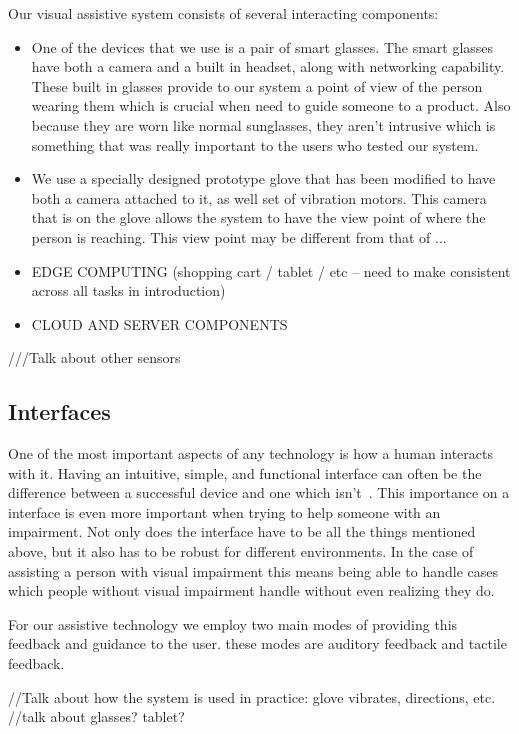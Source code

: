 Our visual assistive system consists of several interacting components: 
\begin{itemize}
\item One of the devices that we use is a pair of smart glasses. The smart
glasses have both a camera and a built in headset, along with
networking capability. These built in glasses provide to our system a
point of view of the person wearing them which is crucial when need to
guide someone to a product. Also because they are worn like normal
sunglasses, they aren't intrusive which is something that was really
important to the users who tested our system.

\item We use a specially designed prototype glove that has been
modified to have both a camera attached to it, as well set of
vibration motors. This camera that is on the glove allows the system
to have the view point of where the person is reaching. This view
point may be different from that of ...

\item EDGE COMPUTING (shopping cart / tablet / etc -- need to make consistent across all tasks in introduction)

\item CLOUD AND SERVER COMPONENTS

\end{itemize}

///Talk about other sensors


\subsection{Interfaces}
One of the most important aspects of any technology is how a human
interacts with it. Having an intuitive, simple, and functional
interface can often be the difference between a successful device and
one which isn't~\cite{iPhone}. This importance on a interface is even more important
when trying to help someone with an impairment. Not only does the
interface have to be all the things mentioned above, but it also has
to be robust for different environments. In the case of assisting a
person with visual impairment this means being able to handle cases
which people without visual impairment handle without even realizing
they do.

For our assistive technology we employ two main modes of providing
this feedback and guidance to the user. these modes are auditory
feedback and tactile feedback. 



//Talk about how the system is used in practice: glove vibrates, directions, etc.
//talk about glasses? tablet?
